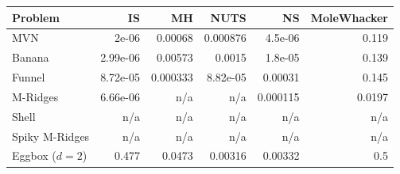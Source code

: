 \begin{tabular}{lrrrrr}
\toprule
Problem & IS & MH & NUTS & NS & MoleWhacker \\
\midrule
MVN & 2e-06 & 0.00068 & 0.000876 & 4.5e-06 & 0.119 \\
Banana & 2.99e-06 & 0.00573 & 0.0015 & 1.8e-05 & 0.139 \\
Funnel & 8.72e-05 & 0.000333 & 8.82e-05 & 0.00031 & 0.145 \\
M-Ridges & 6.66e-06 & n/a & n/a & 0.000115 & 0.0197 \\
Shell & n/a & n/a & n/a & n/a & n/a \\
Spiky M-Ridges & n/a & n/a & n/a & n/a & n/a \\
\midrule
Eggbox ($d=2$) & 0.477 & 0.0473 & 0.00316 & 0.00332 & 0.5 \\
\bottomrule
\end{tabular}
